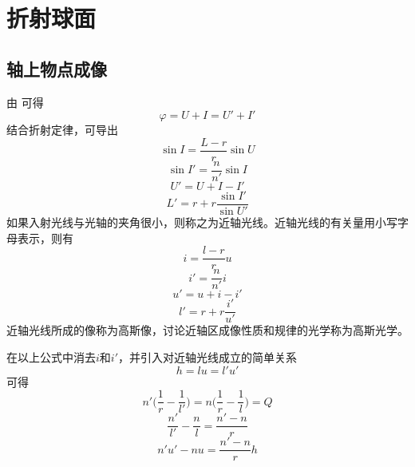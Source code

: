 \documentclass[cn,10pt,chinesefont=founder,math=mtpro2,cite=super,toc=onecol,twoside,openany]{elegantbook}
\begin{document}
\section{折射球面}
\subsection{轴上物点成像}
\label{subsect:paraxial-ray}

由 可得
\begin{equation}
\varphi=U+I=U'+I'
\end{equation}
结合折射定律，可导出
\begin{equation}
\sin I=\frac{L-r}{r}\sin U
\end{equation}
\begin{equation}
\sin I'=\frac{n}{n'}\sin I
\end{equation}
\begin{equation}
U'=U+I-I'
\end{equation}
\begin{equation}
L'=r+r\frac{\sin I'}{\sin U'}
\end{equation}
如果入射光线与光轴的夹角很小，则称之为近轴光线。近轴光线的有关量用小写字母表示，则有
\begin{equation}
i=\frac{l-r}{r}u
\end{equation}
\begin{equation}
i'=\frac{n}{n'}i
\end{equation}
\begin{equation}
u'=u+i-i'
\end{equation}
\begin{equation}
l'=r+r\frac{i'}{u'}
\end{equation}
近轴光线所成的像称为高斯像，讨论近轴区成像性质和规律的光学称为高斯光学。

在以上公式中消去$i$和$i'$，并引入对近轴光线成立的简单关系
\begin{equation}
h=lu=l'u'
\end{equation}
可得
\begin{equation}
n'\bigg(\frac{1}{r}-\frac{1}{l'}\bigg)=n\bigg(\frac{1}{r}-\frac{1}{l}\bigg)=Q
\end{equation}
\begin{equation}
\frac{n'}{l'}-\frac{n}{l}=\frac{n'-n}{r}
\label{eq:spherical-refraction}
\end{equation}
\begin{equation}
n'u'-nu=\frac{n'-n}{r}h
\end{equation}
\end{document}
